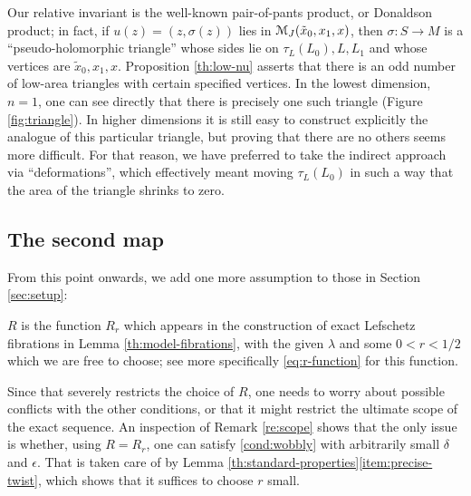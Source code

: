 \documentclass[10pt,letterpaper]{article}
\begin{document}
%
%
\begin{remark}
Our relative invariant is the well-known pair-of-pants product, or Donaldson
product; in fact, if $u(z) = (z,\sigma(z))$ lies in $\mathcal{M}_J(\tilde{x}_0,x_1,x)$,
then $\sigma: S \rightarrow M$ is a ``pseudo-holomorphic triangle'' whose sides
lie on $\tau_L(L_0), L, L_1$ and whose vertices are $\tilde{x}_0,x_1,x$.
Proposition \ref{th:low-nu} asserts that there is an odd number of low-area
triangles with certain specified vertices. In the lowest dimension, $n = 1$,
one can see directly that there is precisely one such triangle (Figure
\ref{fig:triangle}). In higher dimensions it is still easy to construct
explicitly the analogue of this particular triangle, but proving that there are
no others seems more difficult. For that reason, we have preferred to take the
indirect approach via ``deformations'', which effectively meant moving
$\tau_L(L_0)$ in such a way that the area of the triangle shrinks to zero.
\end{remark}

%

\subsection{The second map\label{sec:c}}

From this point onwards, we add one more assumption to those in Section
\ref{sec:setup}:
\begin{Romanlist}
\setcounter{enumi}{5}
\item \label{cond:r}
$R$ is the function $R_r$ which appears in the construction of exact Lefschetz
fibrations in Lemma \ref{th:model-fibrations}, with the given $\lambda$ and
some $0<r<1/2$ which we are free to choose; see more specifically
\eqref{eq:r-function} for this function.
\end{Romanlist}

Since that severely restricts the choice of $R$, one needs to worry about
possible conflicts with the other conditions, or that it might restrict the
ultimate scope of the exact sequence. An inspection of Remark \ref{re:scope}
shows that the only issue is whether, using $R = R_r$, one can satisfy
\ref{cond:wobbly} with arbitrarily small $\delta$ and $\epsilon$. That is taken
care of by Lemma \ref{th:standard-properties}\ref{item:precise-twist}, which
shows that it suffices to choose $r$ small.
\end{document}
